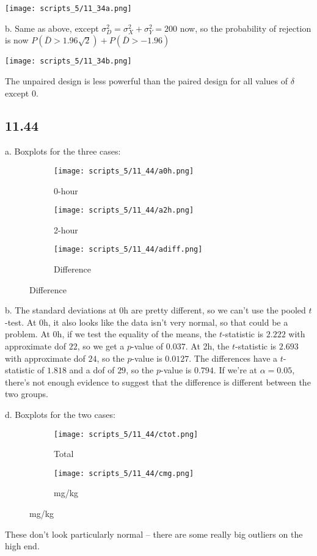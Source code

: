 \documentclass{article}
\begin{document}
\texttt{[image: scripts\_5/11\_34a.png]}

\noindent b. Same as above, except $\sigma_D^2=\sigma_X^2+\sigma_Y^2=200$ now, so the probability of rejection is now $P(\bar{D}>1.96\sqrt{2})+P(\bar{D}>-1.96)$

\texttt{[image: scripts\_5/11\_34b.png]}

The unpaired design is less powerful than the paired design for all values of $\delta$ except $0$.
\subsection*{11.44}
\FloatBarrier
a. Boxplots for the three cases:

\begin{figure}[h]
    \begin{subfigure}[b]{0.33\textwidth}
        \centering
        \texttt{[image: scripts\_5/11\_44/a0h.png]}
        \caption{0-hour}
    \end{subfigure}
    \begin{subfigure}[b]{0.33\textwidth}
        \centering
        \texttt{[image: scripts\_5/11\_44/a2h.png]}
        \caption{2-hour}
    \end{subfigure}
    \begin{subfigure}[b]{0.33\textwidth}
        \centering
        \texttt{[image: scripts\_5/11\_44/adiff.png]}
        \caption{Difference}
    \end{subfigure}
\end{figure}
\FloatBarrier
\noindent b. The standard deviations at 0h are pretty different, so we can't use the pooled $t$-test. At 0h, it also looks like the data isn't very normal, so that could be a problem. At 0h, if we test the equality of the means, the $t$-statistic is $2.222$ with approximate dof $22$, so we get a $p$-value of $0.037$.
At 2h, the $t$-statistic is $2.693$ with approximate dof $24$, so the $p$-value is $0.0127$. The differences have a $t$-statistic of $1.818$ and a dof of $29$, so the $p$-value is $0.794$. If we're at $\alpha=0.05$, there's not enough evidence to suggest that the difference is different between the two groups.

\noindent d. Boxplots for the two cases:
\FloatBarrier
\begin{figure}[h]
    \begin{subfigure}[b]{0.47\textwidth}
        \centering
        \texttt{[image: scripts\_5/11\_44/ctot.png]}
        \caption{Total}
    \end{subfigure}
    \begin{subfigure}[b]{0.47\textwidth}
        \centering
        \texttt{[image: scripts\_5/11\_44/cmg.png]}
        \caption{mg/kg}
    \end{subfigure}
\end{figure}
\FloatBarrier
These don't look particularly normal -- there are some really big outliers on the high end. 
\end{document}
